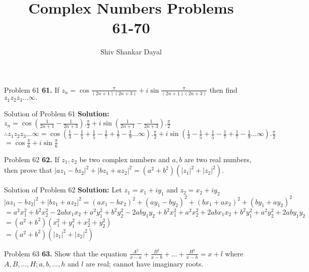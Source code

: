 \documentclass[aspectratio=169,8pt]{beamer}
\title{Complex Numbers Problems\\ 61-70}
\author[Shiv Shankar Dayal]{Shiv Shankar Dayal}
\begin{document}
\begin{frame}
  \titlepage
\end{frame}
\begin{frame}{Problem 61}
  \textbf{61.} If $z_n = \cos\frac{\pi}{(2n + 1)(2n + 3)} + i\sin\frac{\pi}{(2n + 1)(2n + 3)}$ then find $z_1z_2z_3\ldots\infty.$
\end{frame}
\begin{frame}{Solution of Problem 61}
  \textbf{Solution:} $z_n = \cos\left(\frac{1}{2n + 1} - \frac{1}{2n + 3}\right).\frac{\pi}{2} + i\sin\left(\frac{1}{2n + 1} - \frac{1}{2n + 3}\right).\frac{\pi}{2}$\\
  \vspace*{0.2cm}
  $\therefore z_1z_2z_3\ldots\infty = \cos\left(\frac{1}{3} - \frac{1}{5} + \frac{1}{5} - \frac{1}{7} + \frac{1}{7} - \frac{1}{9}\ldots\infty\right).\frac{\pi}{2} + i\sin\left(\frac{1}{3} - \frac{1}{5} + \frac{1}{5} - \frac{1}{7} + \frac{1}{7} - \frac{1}{9}\ldots\infty\right).\frac{\pi}{2}$\\
  \vspace*{0.2cm}
  $= \cos\frac{\pi}{6} + i\sin\frac{\pi}{6}$
\end{frame}
\begin{frame}{Problem 62}
  \textbf{62.} If $z_1, z_2$ be two complex numbers and $a,b$ are two real numbers, then prove that $|az_1 - bz_2|^2 + |bz_1 + az_2|^2 = (a^2 + b^2)(|z_1|^2 + |z_2|^2).$
\end{frame}
\begin{frame}{Solution of Problem 62}
  \textbf{Solution:} Let $z_1 = x_1 + iy_1$ and $z_2 = x_2 + iy_2$\\
  \vspace*{0.2cm}
  $|az_1 - bz_2|^2 + |bz_1 + az_2|^2 = (ax_1 - bx_2)^2 + (ay_1 - by_2)^2 + (bx_1 + ax_2)^2 + (by_1 + ay_2)^2$\\
  \vspace*{0.2cm}
  $= a^2x_1^2 + b^2x_2^2 -2abx_1x_2 + a^2y_1^2 + b^2y_2^2 - 2aby_1y_2 + b^2x_1^2 + a^2x_2^2 + 2abx_1x_2 + b^2y_1^2 + a^2y_2^2 + 2aby_1y_2$\\
  \vspace*{0.2cm}
  $= (a^2 + b^2)(x_1^2 + y_1^2 + x_2^2 + y_2^2)$\\
  \vspace*{0.2cm}
  $= (a^2 + b^2)(|z_1|^2 + |z_2|^2)$
\end{frame}
\begin{frame}{Problem 63}
  \textbf{63.} Show that the equation $\frac{A^2}{x - a} + \frac{B^2}{x - b} + \ldots + \frac{H^2}{x - h} = x + l$ where $A, B, \ldots, H; a, b, \ldots, h$ and $l$ are real; cannot have imaginary roots.
\end{frame}
\end{document}
